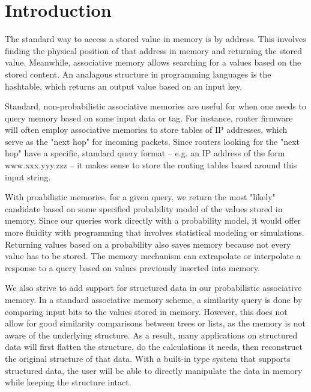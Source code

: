\documentclass{sig-alternate}
\begin{document}
\section{Introduction}
\label{sec:intro}

The standard way to access a stored value in memory is by address. 
This involves finding the physical position of that address in memory
and returning the stored value. Meanwhile, associative memory allows
searching for a values based on the stored content. An analagous structure
in programming languages is the hashtable, which returns an output value
based on an input key. 

Standard, non-probabilistic associative memories are useful for when one needs to query memory based 
on some input data or tag. For instance, router firmware will often employ associative 
memories to store tables of IP addresses, which serve as the "next hop" for incoming 
packets. Since routers looking for the "next hop" have a specific, standard query 
format -- e.g. an IP address of the form www.xxx.yyy.zzz -- it makes sense to store the 
routing tables based around this input string.

With proabilistic memories, for a given query, we return the most "likely" candidate 
based on some specified probability model of the values stored in memory. 
Since our queries work directly with a probability model, it would offer more fluidity
with programming that involves statistical modeling or simulations. Returning values
based on a probability also saves memory because not every value has to be stored. The 
memory mechanism can extrapolate or interpolate a response to a query based on values 
previously inserted into memory. 

We also strive to add support for structured data in our probabilistic associative memory.
In a standard associative memory scheme, a similarity query is done by comparing input bits
to the values stored in memory. However, this does not allow for good similarity comparisons
between trees or lists, as the memory is not aware of the underlying structure. As a result,
many applications on structured data will first flatten the structure, do the calculations
it needs, then reconstruct the original structure of that data. With a built-in type system
that supports structured data, the user will be able to directly manipulate the data in memory 
while keeping the structure intact.
\end{document}
